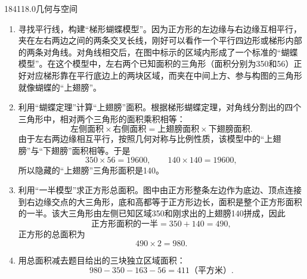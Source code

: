 \begin{solution}{18}{411}{8.0}{几何与空间}
\begin{enumerate}[label=\textbf{Step \arabic*:},leftmargin=*]
  \item 寻找平行线，构建“梯形蝴蝶模型”。因为正方形的左边缘与右边缘互相平行，夹在左右两边之间的两条交叉长线，刚好可以看作一个平行四边形或梯形内部的两条对角线。对角线相交后，在图中标示的区域内形成了一个标准的“蝴蝶模型”。在这个模型中，左右两个已知面积的三角形（面积分别为350和56）正好对应梯形靠在平行底边上的两块区域，而夹在中间上方、参与构图的三角形就像蝴蝶的“上翅膀”。
  \item 利用“蝴蝶定理”计算“上翅膀”面积。根据梯形蝴蝶定理，对角线分割出的四个三角形中，相对两个三角形的面积乘积相等：
  \[
    \text{左侧面积}\times\text{右侧面积}
    =\text{上翅膀面积}\times\text{下翅膀面积}.
  \]
  由于左右两边缘相互平行，按照几何对称与比例性质，该模型中的“上翅膀”与“下翅膀”面积相等。于是
  \[
    350\times56=19600,\qquad140\times140=19600,
  \]
  所以隐藏的“上翅膀”三角形面积是140。
  \item 利用“一半模型”求正方形总面积。图中由正方形整条左边作为底边、顶点连接到右边缘交点的大三角形，底和高都等于正方形边长，面积是整个正方形面积的一半。该大三角形由左侧已知区域350和刚求出的上翅膀140拼成，因此
  \[
    \text{正方形面积的一半}=350+140=490,
  \]
  正方形的总面积为
  \[
    490\times2=980.
  \]
  \item 用总面积减去题目给出的三块独立区域面积：
  \[
    980-350-163-56=411\text{（平方米）}.
  \]
\end{enumerate}
\end{solution}

